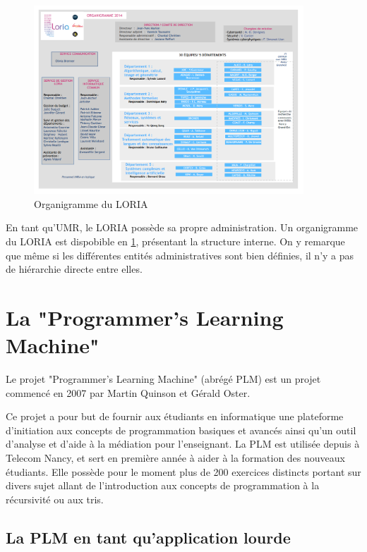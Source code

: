 \documentclass[stage]{tnreport}
\begin{document}
\clearpage

\begin{figure}[h]
	\centering
		\includegraphics[width=0.9\textwidth]{figures/LORIA-organigramme}
	\caption{Organigramme du LORIA}
	\label{fig:organigramme}
\end{figure}

En tant qu'UMR, le LORIA possède sa propre administration. Un organigramme du LORIA est dispobible en \ref{fig:organigramme}\cite{LR-ORG}, présentant la structure interne. On y remarque que même si les différentes entités administratives sont bien définies, il n'y a pas de hiérarchie directe entre elles.


\section{La "Programmer's Learning Machine"}

Le projet "Programmer's Learning Machine" (abrégé PLM) est un projet commencé en 2007 par Martin Quinson et Gérald Oster.

Ce projet a pour but de fournir aux étudiants en informatique une plateforme d'initiation aux concepts de programmation basiques et avancés ainsi qu'un outil d'analyse et d'aide à la médiation pour l'enseignant.
La PLM est utilisée depuis à Telecom Nancy, et sert en première année à aider à la formation des nouveaux étudiants. Elle possède pour le moment plus de 200 exercices distincts portant sur divers sujet allant de l'introduction aux concepts de programmation à la récursivité ou aux tris.

\subsection{La PLM en tant qu'application lourde}
\end{document}
